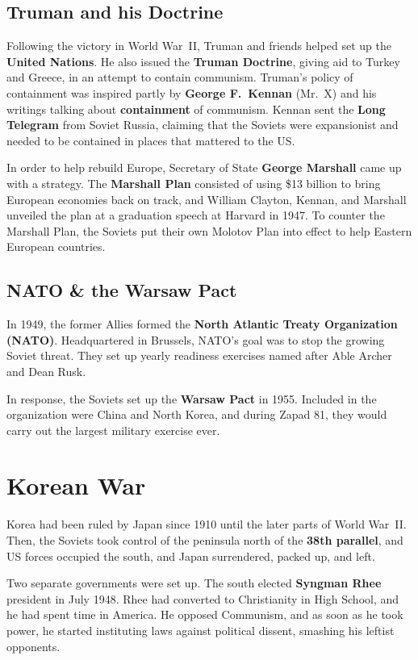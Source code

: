 \subsection*{Truman and his Doctrine}

Following the victory in World War~II, Truman and friends helped set up the \textbf{United Nations}.
He also issued the \textbf{Truman Doctrine}, giving aid to Turkey and Greece, in an attempt to contain communism.
Truman's policy of containment was inspired partly by \textbf{George F.\ Kennan} (Mr.\ X)
and his writings talking about \textbf{containment} of communism.
Kennan sent the \textbf{Long Telegram} from Soviet Russia,
claiming that the Soviets were expansionist and needed to be contained in places that mattered to the US\@.

In order to help rebuild Europe, Secretary of State \textbf{George Marshall} came up with a strategy.
The \textbf{Marshall Plan} consisted of using \$13 billion to bring European economies back on track,
and William Clayton, Kennan, and Marshall unveiled the plan at a graduation speech at Harvard in 1947.
To counter the Marshall Plan, the Soviets put their own Molotov Plan into effect to help Eastern European countries.

\subsection*{NATO \& the Warsaw Pact}

In 1949, the former Allies formed the \textbf{North Atlantic Treaty Organization (NATO)}.
Headquartered in Brussels, NATO's goal was to stop the growing Soviet threat.
They set up yearly readiness exercises named after Able Archer and Dean Rusk.

In response, the Soviets set up the \textbf{Warsaw Pact} in 1955.
Included in the organization were China and North Korea,
and during Zapad 81, they would carry out the largest military exercise ever.

\section{Korean War}

Korea had been ruled by Japan since 1910 until the later parts of World War~II\@.
Then, the Soviets took control of the peninsula north of the \textbf{38th parallel},
and US forces occupied the south, and Japan surrendered, packed up, and left.

Two separate governments were set up.
The south elected \textbf{Syngman Rhee} president in July 1948.
Rhee had converted to Christianity in High School, and he had spent time in America.
He opposed Communism, and as soon as he took power,
he started instituting laws against political dissent, smashing his leftist opponents.

